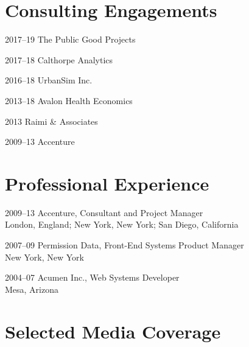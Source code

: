 \documentclass[12pt,letterpaper]{report}
\begin{document}
    \section*{Consulting Engagements}

    \begin{tablist}

        \item[2017--19] \tab The Public Good Projects

        \item[2017--18] \tab Calthorpe Analytics

        \item[2016--18] \tab UrbanSim Inc.

        \item[2013--18] \tab Avalon Health Economics

        \item[2013]     \tab Raimi \& Associates

        \item[2009--13] \tab Accenture

    \end{tablist}



    \section*{Professional Experience}

    \begin{tablist}

        \item[2009--13] \tab Accenture, Consultant and Project Manager\\
                             London, England; New York, New York; San Diego, California

        \item[2007--09] \tab Permission Data, Front-End Systems Product Manager\\
                             New York, New York

        \item[2004--07] \tab Acumen Inc., Web Systems Developer\\
                             Mesa, Arizona

    \end{tablist}



    \section*{Selected Media Coverage}
\end{document}
